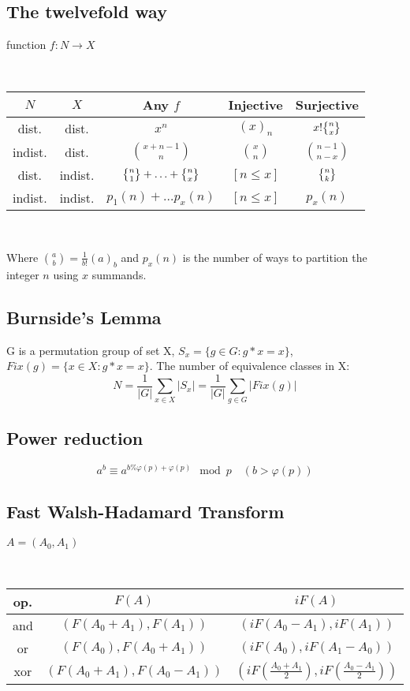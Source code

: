 	\subsection{The twelvefold way} function $f \colon N \rightarrow X$
	
	\ 
	
	\begin{tabular}{|c|c|c|c|c|}
	    	\hline
	    	$N$ & $X$ & Any $f$ & Injective & Surjective \\ \hline
	    	dist. & dist. & $x^n$ & $(x)_n$ & $x! \stirlingsecond{n}{x}$ \\ \hline
	    	indist. & dist. & $\binom{x+n-1}{n}$ & $\binom{x}{n}$ & $\binom{n-1}{n-x}$ \\ \hline
	    	dist. & indist. & $\stirlingsecond{n}{1} + \ldots + \stirlingsecond{n}{x}$ & $[n \leq x]$ & $\stirlingsecond{n}{k}$ \\ \hline
	    	indist. & indist. & $p_1(n) + \ldots p_x(n)$ & $[n \leq x]$ & $p_x(n)$ \\ \hline
	\end{tabular}
	
	\ 
	
	Where $\binom{a}{b} = \frac{1}{b!}(a)_b $ and $p_x(n)$ is the number of ways to partition the integer $n$ using $x$ summands.
	
	\subsection{Burnside's Lemma} G is a permutation group of set X, $S_x = \{g \in G:g*x=x\}$, $Fix(g) = \{x \in X:g*x=x\}$. The number of equivalence classes in X:
	\begin{equation*}
	N = \frac{1}{|G|}\sum_{x \in X}|S_x| = \frac{1}{|G|}\sum_{g \in G}|Fix(g)|
	\end{equation*}
	
	\subsection{Power reduction}
	\begin{equation*}
		a^b\equiv a^{b\%\varphi(p)+\varphi(p)}\mod p \quad (b>\varphi(p))
	\end{equation*}
	
	\subsection{Fast Walsh-Hadamard Transform} $A=(A_0,A_1)$

	\
	
	\begin{tabular}{|c|c|c|}
		\hline
		op.&$F(A)$&$iF(A)$\\\hline
		and&$(F(A_0+A_1),F(A_1))$&$(iF(A_0-A_1),iF(A_1))$\\\hline
		or&$(F(A_0),F(A_0+A_1))$&$(iF(A_0),iF(A_1-A_0))$\\\hline
		xor&$(F(A_0+A_1),F(A_0-A_1))$&$(iF(\frac{A_0+A_1}{2}),iF(\frac{A_0-A_1}{2}))$\\\hline
	\end{tabular}
